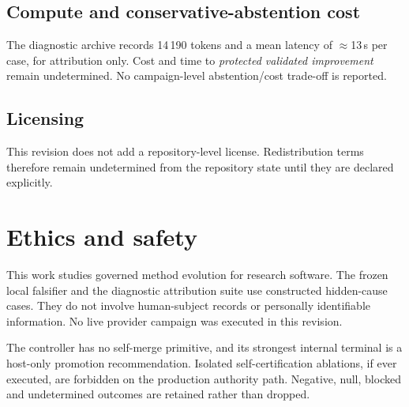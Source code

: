 \subsection*{Compute and conservative-abstention cost}

The diagnostic archive records 14\,190 tokens and a mean latency of $\approx$13\,s per case, for attribution only. Cost and time to \emph{protected validated improvement} remain undetermined. No campaign-level abstention/cost trade-off is reported.

\subsection*{Licensing}

This revision does not add a repository-level license. Redistribution terms therefore remain undetermined from the repository state until they are declared explicitly.

\section{Ethics and safety}
\label{sec:ethics}

This work studies governed method evolution for research software. The frozen local falsifier and the diagnostic attribution suite use constructed hidden-cause cases. They do not involve human-subject records or personally identifiable information. No live provider campaign was executed in this revision.

The controller has no self-merge primitive, and its strongest internal terminal is a host-only promotion recommendation. Isolated self-certification ablations, if ever executed, are forbidden on the production authority path. Negative, null, blocked and undetermined outcomes are retained rather than dropped.
